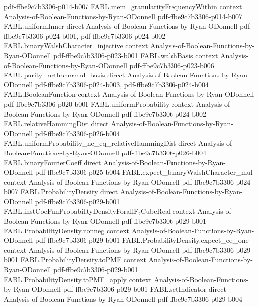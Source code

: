 \begin{theorem}
  {pdf-ffbe9c7b3306-p014-b007}
\proofstep
  {FABL.mem_granularityFrequencyWithin}
  {context}
  {Analysis-of-Boolean-Functions-by-Ryan-ODonnell}
  {pdf-ffbe9c7b3306-p014-b007}
\proofstep
  {FABL.uniformInner}
  {direct}
  {Analysis-of-Boolean-Functions-by-Ryan-ODonnell}
  {pdf-ffbe9c7b3306-p024-b001,
    pdf-ffbe9c7b3306-p024-b002}
\proofstep
  {FABL.binaryWalshCharacter_injective}
  {context}
  {Analysis-of-Boolean-Functions-by-Ryan-ODonnell}
  {pdf-ffbe9c7b3306-p023-b001}
\proofstep
  {FABL.walshBasis}
  {context}
  {Analysis-of-Boolean-Functions-by-Ryan-ODonnell}
  {pdf-ffbe9c7b3306-p023-b006}
\proofstep
  {FABL.parity_orthonormal_basis}
  {direct}
  {Analysis-of-Boolean-Functions-by-Ryan-ODonnell}
  {pdf-ffbe9c7b3306-p024-b003,
    pdf-ffbe9c7b3306-p024-b004}
\proofstep
  {FABL.BooleanFunction}
  {context}
  {Analysis-of-Boolean-Functions-by-Ryan-ODonnell}
  {pdf-ffbe9c7b3306-p020-b001}
\proofstep
  {FABL.uniformProbability}
  {context}
  {Analysis-of-Boolean-Functions-by-Ryan-ODonnell}
  {pdf-ffbe9c7b3306-p024-b002}
\proofstep
  {FABL.relativeHammingDist}
  {direct}
  {Analysis-of-Boolean-Functions-by-Ryan-ODonnell}
  {pdf-ffbe9c7b3306-p026-b004}
\proofstep
  {FABL.uniformProbability_ne_eq_relativeHammingDist}
  {direct}
  {Analysis-of-Boolean-Functions-by-Ryan-ODonnell}
  {pdf-ffbe9c7b3306-p026-b004}
\proofstep
  {FABL.binaryFourierCoeff}
  {direct}
  {Analysis-of-Boolean-Functions-by-Ryan-ODonnell}
  {pdf-ffbe9c7b3306-p025-b004}
\proofstep
  {FABL.expect_binaryWalshCharacter_mul}
  {context}
  {Analysis-of-Boolean-Functions-by-Ryan-ODonnell}
  {pdf-ffbe9c7b3306-p024-b007}
\proofstep
  {FABL.ProbabilityDensity}
  {direct}
  {Analysis-of-Boolean-Functions-by-Ryan-ODonnell}
  {pdf-ffbe9c7b3306-p029-b001}
\proofstep
  {FABL.instCoeFunProbabilityDensityForallF₂CubeReal}
  {context}
  {Analysis-of-Boolean-Functions-by-Ryan-ODonnell}
  {pdf-ffbe9c7b3306-p029-b001}
\proofstep
  {FABL.ProbabilityDensity.nonneg}
  {context}
  {Analysis-of-Boolean-Functions-by-Ryan-ODonnell}
  {pdf-ffbe9c7b3306-p029-b001}
\proofstep
  {FABL.ProbabilityDensity.expect_eq_one}
  {context}
  {Analysis-of-Boolean-Functions-by-Ryan-ODonnell}
  {pdf-ffbe9c7b3306-p029-b001}
\proofstep
  {FABL.ProbabilityDensity.toPMF}
  {context}
  {Analysis-of-Boolean-Functions-by-Ryan-ODonnell}
  {pdf-ffbe9c7b3306-p029-b001}
\proofstep
  {FABL.ProbabilityDensity.toPMF_apply}
  {context}
  {Analysis-of-Boolean-Functions-by-Ryan-ODonnell}
  {pdf-ffbe9c7b3306-p029-b001}
\proofstep
  {FABL.setIndicator}
  {direct}
  {Analysis-of-Boolean-Functions-by-Ryan-ODonnell}
  {pdf-ffbe9c7b3306-p029-b004}
\proofstep

\end{theorem}
